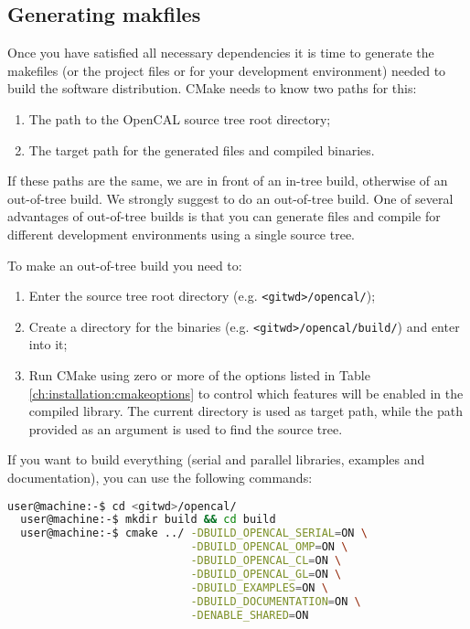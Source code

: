 
\subsection{Generating makfiles}

Once you have satisfied all necessary dependencies it is time to
generate the makefiles (or the project files or for your development
environment) needed to build the software distribution. CMake needs to
know two paths for this:
\begin{enumerate}
\item The path to the OpenCAL source tree root directory;
\item The target path for the generated files and compiled binaries.
\end{enumerate}

If these paths are the same, we are in front of an in-tree build,
otherwise of an out-of-tree build. We strongly suggest to do an
out-of-tree build. One of several advantages of out-of-tree builds is
that you can generate files and compile for different development
environments using a single source tree.

To make an out-of-tree build you need to:
\begin{enumerate}
\item Enter the source tree root directory (e.g. \verb'<gitwd>/opencal/');
\item Create a directory for the binaries
  (e.g. \verb'<gitwd>/opencal/build/') and enter into it;
\item Run CMake using zero or more of the options listed in Table
  \ref{ch:installation:cmakeoptions} to control which features will be
  enabled in the compiled library. The current directory is used as
  target path, while the path provided as an argument is used to find
  the source tree.
\end{enumerate}

If you want to build everything (serial and parallel libraries,
examples and documentation), you can use the following commands:

\begin{lstlisting}[numbers=none,language=bash,label={ch:quickstart:simplebuild}]
  user@machine:-$ cd <gitwd>/opencal/
  user@machine:-$ mkdir build && cd build
  user@machine:-$ cmake ../ -DBUILD_OPENCAL_SERIAL=ON \
                            -DBUILD_OPENCAL_OMP=ON \
                            -DBUILD_OPENCAL_CL=ON \
                            -DBUILD_OPENCAL_GL=ON \
                            -DBUILD_EXAMPLES=ON \
                            -DBUILD_DOCUMENTATION=ON \
                            -DENABLE_SHARED=ON
\end{lstlisting}

